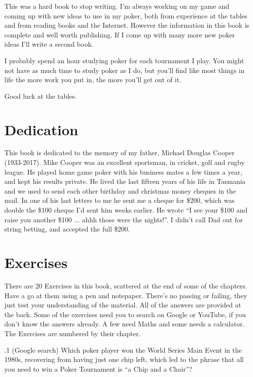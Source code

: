 This was a hard book to stop writing. I'm always working on my game
and coming up with new ideas to use in my poker, both from experience
at the tables and from reading books and the Internet. However the
information in this book is complete and well worth
publishing. If I come up with many more new poker ideas I'll write
a second book.

I probably spend an hour studying poker for each tournament I play.
You might not have as much time to study poker as I do, but you'll
find like most things in life the more work you put in, the
more you'll get out of it.

Good luck at the tables.

\section{Dedication}

This book is dedicated to the memory of my father,
Michael Douglas Cooper (1933-2017). Mike Cooper was an excellent
sportsman, in cricket, golf and rugby league. He played home game
poker with his business mates a few times a year, and kept his results
private. He lived the last fifteen years of his life in Tasmania and
we used to send each other birthday and christmas money cheques in the
mail. In one of his last letters to me he sent me a cheque for \$200,
which was double the \$100 cheque I'd sent him weeks earlier. He wrote
``I see your \$100 and raise you another \$100 ... ahhh those were the
nights!''. I didn't call Dad out for string betting, and accepted the
full \$200.

\section{Exercises}


There are 20 Exercises in this book, scattered at the end of some of
the chapters. Have a go at them using a pen and notepaper. There's no
passing or failing, they just test your understanding of the
material. All of the answers are provided at the back. Some of the
exercises need you to search on Google or YouTube, if you don't know
the answers already. A few need Maths and some needs a calculator. The
Exercises are numbered by their chapter.

.1 (Google search) Which poker player won the World
Series Main Event in the 1980s, recovering from having just one chip
left, which led to the phrase that all you need to win a Poker
Tournament is ``a Chip and a Chair''?


